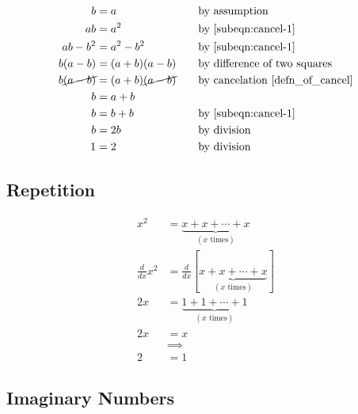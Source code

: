 \documentclass{article}
\newcommand{\justif}[2]{&{#1}&\text{#2}}
\begin{document}
	\begin{subequations}
	\begin{align}
		b        &= a  \justif{\quad}{by assumption} \label{subeqn:cancel-1} \\
		ab       &= a^2 \justif{\quad}{by \ref{subeqn:cancel-1}} \label{subeqn:cancel-2} \\
		ab - b^2 &= a^2 - b^2 \justif{\quad}{by \ref{subeqn:cancel-1}} \label{subeqn:cancel-3} \\
		b(a - b) &= (a + b)(a - b) \justif{\quad}{by difference of two squares}  \label{subeqn:cancel-4} \\
		b\cancel{(a - b)} &= (a + b)\cancel{(a - b)} \justif{\quad}{by cancelation \cite{defn_of_cancel}} \label{subeqn:cancel-5} \\
		b        &= a + b \justif{\quad}{}\label{subeqn:cancel-6} \\
		b        &= b + b \justif{\quad}{by \ref{subeqn:cancel-1}} \label{subeqn:cancel-7} \\
		b        &= 2b \justif{\quad}{by division} \label{subeqn:cancel-8} \\
		1        &= 2 \justif{\quad}{by division} \label{subeqn:cancel-9}
	\end{align}
	\label{eqn:all-lines}
\end{subequations}

\subsection{Repetition}

\begin{equation}
	\begin{split}
		x^2& = \underbrace{x+x+\cdots+x}_{(x\text{ times})} \\
		\frac{d}{dx}x^2& = \frac{d}{dx}[\underbrace{x+x+\cdots+x}_{(x\text{ times})}] \\
		2x& = \underbrace{1+1+\cdots+1}_{(x\text{ times})} \\
		2x& = x \\
		& \implies \\
		2& = 1
	\end{split}
\end{equation}

\subsection{Imaginary Numbers}
\end{document}
